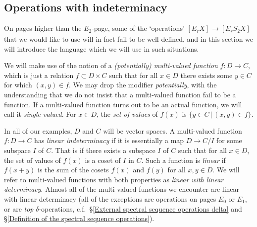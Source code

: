 \documentclass[11pt]{amsart} \renewcommand{\baselinestretch}{1.2}
\theoremstyle{plain}
\numberwithin{equation}{section} %
\theoremstyle{plain}
\numberwithin{equation}{chapter} %
\renewcommand{\to}{\longrightarrow}
\newcommand{\E}[5]{[E^{#1}_{#2}#3]^{#4}_{#5}}
\newcommand{\SubsectionOrSection}[1]{\subsection{#1}}
\begin{document}
\begin{second quadrant homotopy sseq operations}
\SubsectionOrSection{Operations with indeterminacy}
\label{Operations with indeterminacy}
On pages higher than the $E_2$-page, some of the `operations' 
$\E{}{r}{X}{}{}\to \E{}{r}{S_2X}{}{}$
that we would like to use will in fact fail to be well defined, and in this section we will introduce the language which we will use in such situations.

We will make use of the notion of a  \emph{(potentially) multi-valued function} $f:D\to C$, which  is just a relation
$f\subset D\times C$
such that for all $x\in D$ there exists some $y\in C$ for which $(x,y)\in f$. We may drop the modifier \emph{potentially}, with the understanding that we do not insist that a multi-valued function fail to be a function. If a multi-valued function turns out to be an actual function, we will call it \emph{single-valued}. For $x\in D$, the \emph{set of values} of $f(x)$ is 
$\{y\in C\,|\,(x,y)\in f\}$.

In all of our examples, $D$ and $C$ will be vector spaces. A multi-valued function $f:D\to C$ has \emph{linear indeterminacy} if it is essentially a map $D\to C/I$ for some subspace $I$ of $C$. That is if there exists a subspace $I$ of $C$ such that for all $x\in D$, the set of values of $f(x)$ is a coset of $I$ in $C$. Such a function is \emph{linear} if $f(x+y)$ is the sum of the cosets $f(x)$ and $f(y)$ for all $x,y\in D$. We will refer to multi-valued functions with both properties as \emph{linear with linear determinacy}.
Almost all of the multi-valued functions we encounter are linear with linear determinacy (all of the exceptions are operations on pages $E_0$ or $E_1$,  or are \emph{top} $\delta$-operations, c.f.\ \S\ref{External spectral sequence operations delta} and \S\ref{Definition of the spectral sequence operations}).
%


\end{second quadrant homotopy sseq operations}
\end{document}
